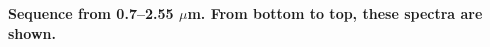 {\bf Sequence from 0.7–2.55 $\mu$m. From bottom to top, these spectra are shown.\label{fig:stack-plot-low-snr}}

